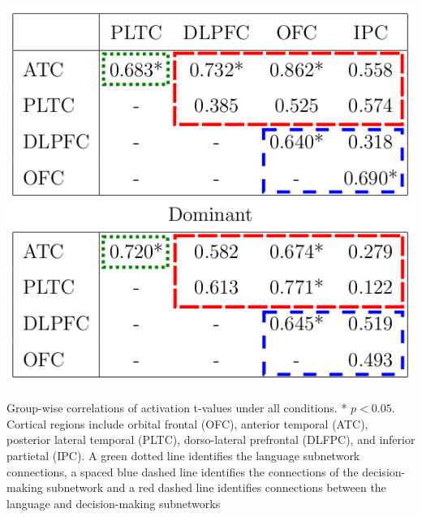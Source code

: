 \documentclass[final,authoryear,5p,times,twocolumn]{elsarticle}
\begin{document}
\begin{table}[h]
\begin{center}
\includegraphics[width=0.75\linewidth]{figures/subnet_table_2.png}
\caption{Group-wise correlations of activation t-values under all conditions. * $p<0.05$. Cortical regions include orbital frontal (OFC), anterior temporal (ATC), posterior lateral temporal (PLTC), dorso-lateral prefrontal (DLFPC), and inferior partietal (IPC). A green dotted line identifies the language subnetwork connections, a spaced blue dashed line identifies the connections of the decision-making subnetwork and a red dashed line identifies connections between the language and decision-making subnetworks }
\label{table:popcorrt}
\end{center}
\end{table}
\end{document}
